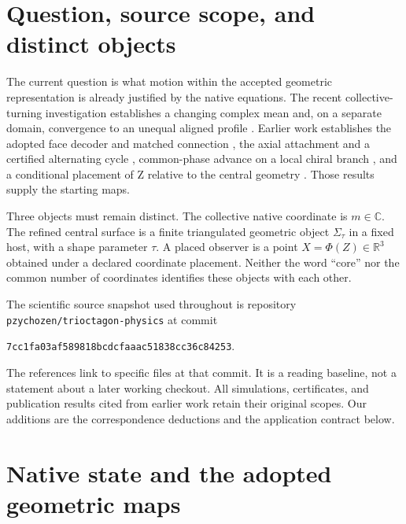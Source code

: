 \documentclass[11pt,a4paper]{article}
\numberwithin{equation}{section}
\theoremstyle{definition}
\theoremstyle{remark}
\newcommand{\R}{\mathbb R}
\newcommand{\C}{\mathbb C}
\begin{document}
\section{Question, source scope, and distinct objects}\label{sec:question}

The current question is what motion within the accepted geometric
representation is already justified by the native equations. The recent
collective-turning investigation establishes a changing complex mean and,
on a separate domain, convergence to an unequal aligned profile
\cite{Collective}. Earlier work establishes the adopted face decoder and
matched connection \cite{Attachment}, the axial attachment and a certified
alternating cycle \cite{PaperG}, common-phase advance on a local chiral branch
\cite{Drift}, and a conditional placement of Z relative to the central
geometry \cite{Central}. Those results supply the starting maps.

Three objects must remain distinct. The collective native coordinate is
$m\in\C$. The refined central surface is a finite triangulated geometric
object $\Sigma_\tau$ in a fixed host, with a shape parameter $\tau$. A placed
observer is a point $X=\Phi(Z)\in\R^3$ obtained under a declared coordinate
placement. Neither the word ``core'' nor the common number of coordinates
identifies these objects with each other.

The scientific source snapshot used throughout is repository
\texttt{pzychozen/trioctagon-physics} at commit
\begin{center}\small
\texttt{7cc1fa03af589818bcdcfaaac51838cc36c84253}.
\end{center}
The references link to specific files at that commit. It is a reading
baseline, not a statement about a later working checkout. All simulations,
certificates, and publication results cited from earlier work retain their
original scopes. Our additions are the correspondence deductions and the
application contract below.

\section{Native state and the adopted geometric maps}\label{sec:definitions}
\end{document}

